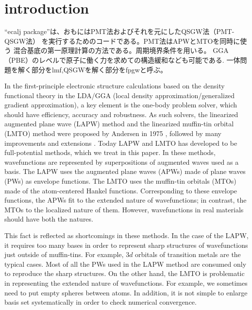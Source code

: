 \documentclass[a4paper,10pt,aip,onecolumn,amsmath,amssymb,floatfix,rmp]{revtex4-1}
\begin{document}
\section{introduction}
``ecalj package''は、おもにはPMT法およびそれを元にしたQSGW法（PMT-QSGW法） 
を実行するためのコードである。PMT法はAPWとMTOを同時に使う
混合基底の第一原理計算の方法である。周期境界条件を用いる。
GGA（PBE）のレベルで原子に働く力を求めての構造緩和なども可能である.
一体問題を解く部分をlmf,QSGWを解く部分をfpgwと呼ぶ。

In the first-principle electronic structure calculations based on the
density functional theory in the LDA/GGA
(local density approximation/generalized gradient approximation),
a key element is the one-body problem solver, which 
should have efficiency, accuracy and robustness.
As such solvers, the linearized augmented plane wave (LAPW) method and the 
linearized muffin-tin orbital (LMTO) method were proposed by Andersen
in 1975 \cite{Andersen75}, followed by many improvements
and extensions \cite{rmartinbook,Singhbook,bluegel31,lmfchap,PAW,PhysRevB.43.6388}.
Today LAPW and LMTO has developed to be full-potential methods, 
which we treat in this paper.
In these methods, wavefunctions are represented by superpositions of
augmented waves used as a basis. The LAPW uses the augmented plane waves (APWs) made 
of plane waves (PWs) as envelope functions. 
The LMTO uses the muffin-tin orbitals (MTOs) made of the atom-centered 
Hankel functions. Corresponding to these envelope functions, the APWs fit to
the extended nature of wavefunctions; 
in contrast, the MTOs to the localized nature of them.
However, wavefunctions in real materials should have both the natures.

This fact is reflected as shortcomings in these methods.
In the case of the LAPW, it requires too many bases 
in order to represent sharp structures of wavefunctions 
just outside of muffin-tins. For example, 3$d$ orbitals of transition
metals are the typical cases. Most of all the PWs used in the LAPW method 
are consumed only to reproduce the sharp structures.
On the other hand, the LMTO is problematic in representing 
the extended nature of wavefunctions. For example, we sometimes need to 
put empty spheres between atoms. In addition, it is not 
simple to enlarge basis set systematically 
in order to check numerical convergence.
\end{document}
